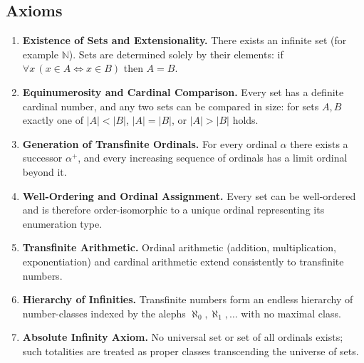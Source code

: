 \documentclass[11pt]{article}
\begin{document}
\subsection*{Axioms}
\begin{enumerate}
  \item \textbf{Existence of Sets and Extensionality.} There exists an infinite set (for example $\mathbb{N}$). Sets are determined solely by their elements: if $\forall x\,(x\in A \Leftrightarrow x\in B)$ then $A=B$.\label{ax:existence}
  \item \textbf{Equinumerosity and Cardinal Comparison.} Every set has a definite cardinal number, and any two sets can be compared in size: for sets $A,B$ exactly one of $|A|<|B|$, $|A|=|B|$, or $|A|>|B|$ holds.\label{ax:compare}
  \item \textbf{Generation of Transfinite Ordinals.} For every ordinal $\alpha$ there exists a successor $\alpha^+$, and every increasing sequence of ordinals has a limit ordinal beyond it.\label{ax:generate}
  \item \textbf{Well-Ordering and Ordinal Assignment.} Every set can be well-ordered and is therefore order-isomorphic to a unique ordinal representing its enumeration type.\label{ax:wellorder}
  \item \textbf{Transfinite Arithmetic.} Ordinal arithmetic (addition, multiplication, exponentiation) and cardinal arithmetic extend consistently to transfinite numbers.\label{ax:arithmetic}
  \item \textbf{Hierarchy of Infinities.} Transfinite numbers form an endless hierarchy of number-classes indexed by the alephs $\aleph_0,\aleph_1,\ldots$ with no maximal class.\label{ax:hierarchy}
  \item \textbf{Absolute Infinity Axiom.} No universal set or set of all ordinals exists; such totalities are treated as proper classes transcending the universe of sets.\label{ax:absolute}
\end{enumerate}
\end{document}
